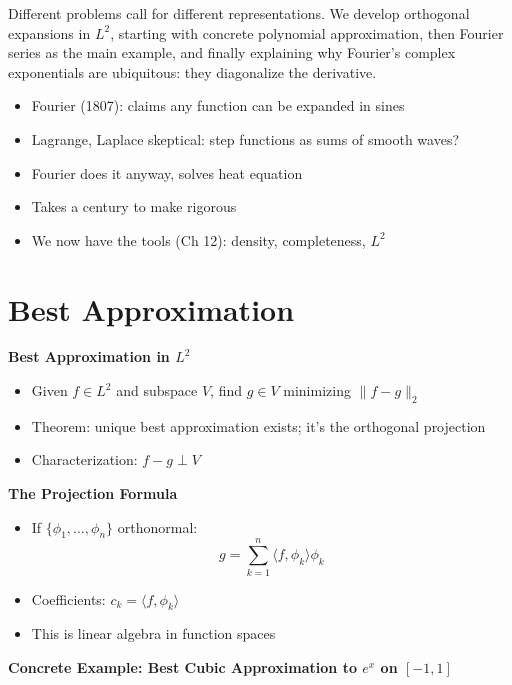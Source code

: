 \documentclass[
  10pt,
  letterpaper,
]{scrbook}
\providecommand{\tightlist}{%
  \setlength{\itemsep}{0pt}\setlength{\parskip}{0pt}}
\begin{document}
Different problems call for different representations. We develop
orthogonal expansions in \(L^2\), starting with concrete polynomial
approximation, then Fourier series as the main example, and finally
explaining why Fourier's complex exponentials are ubiquitous: they
diagonalize the derivative.

\begin{itemize}
\tightlist
\item
  Fourier (1807): claims any function can be expanded in sines
\item
  Lagrange, Laplace skeptical: step functions as sums of smooth waves?
\item
  Fourier does it anyway, solves heat equation
\item
  Takes a century to make rigorous
\item
  We now have the tools (Ch 12): density, completeness, \(L^2\)
\end{itemize}

\section{Best Approximation}\label{best-approximation}

\textbf{Best Approximation in \(L^2\)}

\begin{itemize}
\tightlist
\item
  Given \(f \in L^2\) and subspace \(V\), find \(g \in V\) minimizing
  \(\|f - g\|_2\)
\item
  Theorem: unique best approximation exists; it's the orthogonal
  projection
\item
  Characterization: \(f - g \perp V\)
\end{itemize}

\textbf{The Projection Formula}

\begin{itemize}
\tightlist
\item
  If \(\{\phi_1, \ldots, \phi_n\}\) orthonormal:
  \[g = \sum_{k=1}^n \langle f, \phi_k \rangle \phi_k\]
\item
  Coefficients: \(c_k = \langle f, \phi_k \rangle\)
\item
  This is linear algebra in function spaces
\end{itemize}

\textbf{Concrete Example: Best Cubic Approximation to \(e^x\) on
\([-1,1]\)}
\end{document}
